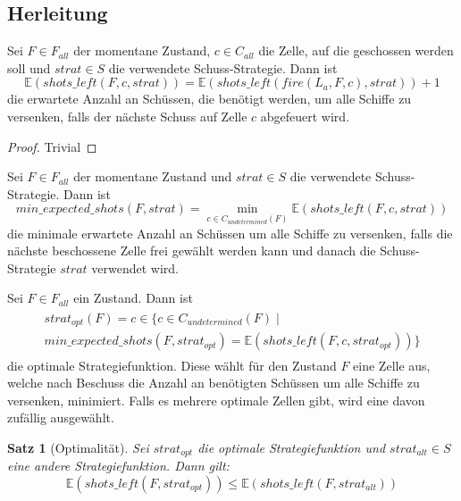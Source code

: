 \documentclass[a4paper,12pt]{llncs}
\numberwithin{equation}{section}
\newtheorem{satz}{Satz}
\begin{document}
\subsection{Herleitung}

\begin{lemma}
Sei $F\in F_{all}$ der momentane Zustand, $c\in C_{all}$ die Zelle, auf die geschossen werden soll und $strat \in S$ die verwendete Schuss-Strategie.
Dann ist
\[
\mathds{E}(shots\_left(F, c, strat))=\mathds{E}(shots\_left(fire(L_a, F, c), strat)) + 1
\]
die erwartete Anzahl an Schüssen, die benötigt werden, um alle Schiffe zu versenken, falls der nächste Schuss auf Zelle $c$ abgefeuert wird.
\end{lemma}

\begin{proof}
Trivial
\end{proof}

\begin{definition}
Sei $F\in F_{all}$ der momentane Zustand und $strat \in S$ die verwendete Schuss-Strategie.
Dann ist
\[
min\_expected\_shots(F, strat)=\min_{c \in C_{undetermined}(F)} \mathds{E}(shots\_left(F, c, strat))
\]
die minimale erwartete Anzahl an Schüssen um alle Schiffe zu versenken, falls die nächste beschossene Zelle frei gewählt werden kann und danach die Schuss-Strategie $strat$ verwendet wird.
\end{definition}

\begin{definition}
Sei $F\in F_{all}$ ein Zustand.
Dann ist
\begin{align}
\begin{split}
strat_{opt}(F)=c \in \{c \in C_{undetermined}(F) \mid \\
min\_expected\_shots(F, strat_{opt})= \mathds{E}(shots\_left(F, c, strat_{opt}))\}
\end{split}
\end{align}
die optimale Strategiefunktion.
Diese wählt für den Zustand $F$ eine Zelle aus, welche nach Beschuss die Anzahl an benötigten Schüssen um alle Schiffe zu versenken, minimiert. Falls es mehrere optimale Zellen gibt, wird eine davon zufällig ausgewählt.
\end{definition}

\begin{satz}[Optimalität]
Sei $strat_{opt}$ die optimale Strategiefunktion und $strat_{alt} \in S$ eine andere Strategiefunktion.
Dann gilt:
\[
\mathds{E}(shots\_left(F, strat_{opt})) \leq \mathds{E}(shots\_left(F, strat_{alt}))
\]
\end{satz}
\end{document}
